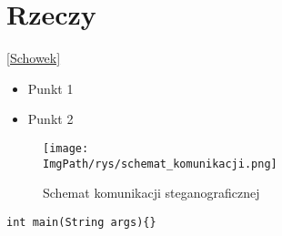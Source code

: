 \documentclass[a4paper,12pt,twoside,openany]{report}
\newcommand{\ImgPath}{.}
\begin{document}
\section{Rzeczy}
\ref{Schowek}
\cite{Stevens}
\begin{itemize}
	\item Punkt 1
	\item Punkt 2
\end{itemize}
\begin{figure}[!htbp]
	\begin{center}
		\centering
		\texttt{[image: \\ImgPath/rys/schemat\_komunikacji.png]}
	\end{center}
	\caption{Schemat komunikacji steganograficznej}
	\label{schematKomunikacji}
\end{figure}
\begin{lstlisting}
int main(String args){}
\end{lstlisting}


\begin{thebibliography}{99}

\end{thebibliography}

\zakonczenie  %
\end{document}
